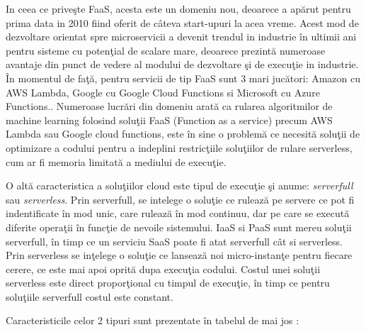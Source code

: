 \documentclass[a4paper,12pt]{report}
\begin{document}
\par In ceea ce priveşte FaaS, acesta este un domeniu nou, deoarece a apărut pentru prima data in 2010 fiind oferit de câteva start-upuri la acea vreme. Acest mod de dezvoltare orientat spre microservicii a devenit trendul in industrie în ultimii ani pentru sisteme cu potenţial de scalare mare, deoarece prezintă numeroase avantaje din punct de vedere al modului de dezvoltare şi de execuţie in industrie. În momentul de faţă, pentru servicii de tip FaaS sunt 3 mari jucători: Amazon cu AWS Lambda, Google cu Google Cloud Functions si Microsoft cu Azure Functions.\cite{jonas2019cloud}. Numeroase lucrări din domeniu \cite{christidis2019, wang2019} arată ca rularea algoritmilor de machine learning folosind soluţii FaaS (Function as a service) precum AWS Lambda sau Google cloud functions, este în sine o problemă ce necesită soluţii de optimizare a codului pentru a indeplini restricţiile soluţiilor de rulare serverless, cum ar fi memoria limitată a mediului de execuţie. 
\par 
O altă caracteristica a soluţiilor cloud este tipul de execuţie şi anume: \emph{serverfull} sau \emph{serverless}.
Prin serverfull, se intelege o soluţie ce rulează pe servere ce pot fi indentificate în mod unic, care rulează în mod continuu, dar pe care se execută diferite operaţii în funcţie de nevoile sistemului. IaaS si PaaS sunt mereu soluţii serverfull, în timp ce un serviciu SaaS poate fi atat serverfull cât si serverless.
Prin serverless se inţelege o soluţie ce lansează noi micro-instanţe pentru fiecare cerere, ce este mai apoi oprită dupa execuţia codului. Costul unei soluţii serverless este direct proporţional cu timpul de execuţie, în timp ce pentru soluţiile serverfull costul este constant. \\
\par Caracteristicile celor 2 tipuri sunt prezentate în tabelul de mai jos :
\end{document}
